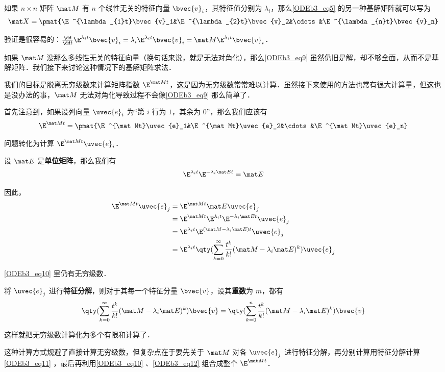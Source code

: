 如果 $n\times n$ 矩阵 $\mat M$ 有 $n$ 个线性无关的特征向量 $\bvec{v}_i$，其特征值分别为 $\lambda_i$，那么\autoref{ODEb3_eq5} 的另一种基解矩阵就可以写为
\begin{equation}\label{ODEb3_eq9}
\mat X=\pmat{\E^{\lambda_{1}t}\bvec{v}_1&\E^{\lambda_{2}t}\bvec{v}_2&\cdots&\E^{\lambda_{n}t}\bvec{v}_n}
\end{equation}

验证是很容易的：$\frac{\dd}{\dd t}\E^{\lambda_{i}t}\bvec{v}_i=\lambda_i\E^{\lambda_{i}t}\bvec{v}_i=\mat M\E^{\lambda_{i}t}\bvec{v}_i$．

如果 $\mat M$ 没那么多线性无关的特征向量（换句话来说，就是无法对角化），那么\autoref{ODEb3_eq9} 虽然仍旧是解，却不够全面，从而不是基解矩阵．我们接下来讨论这种情况下的基解矩阵求法．

我们的目标是脱离无穷级数来计算矩阵指数 $\E^{\mat Mt}$，这是因为无穷级数常常难以计算．虽然接下来使用的方法也常有很大计算量，但这也是没办法的事，$\mat M$ 无法对角化导致过程不会像\autoref{ODEb3_eq9} 那么简单了．

首先注意到，如果设列向量 $\uvec{e}_i$ 为“第 $i$ 行为 $1$，其余为 $0$”，那么我们应该有
\begin{equation}\label{ODEb3_eq12}
\E^{\mat Mt}=\pmat{\E^{\mat Mt}\uvec{e}_1&\E^{\mat Mt}\uvec{e}_2&\cdots&\E^{\mat Mt}\uvec{e}_n}
\end{equation}

问题转化为计算 $\E^{\mat Mt}\uvec{e}_i$．

设 $\mat E$ 是\textbf{单位矩阵}，那么我们有
\begin{equation}
\E^{\lambda_it}\E^{-\lambda_i\mat Et}=\mat E
\end{equation}

因此，
\begin{equation}\label{ODEb3_eq10}
\begin{aligned}
\E^{\mat Mt}\uvec{e}_j&=\E^{\mat Mt}\mat E\uvec{e}_j\\
&=\E^{\mat Mt}\E^{\lambda_it}\E^{-\lambda_i\mat Et}\uvec{e}_j\\
&=\E^{\lambda_it}\E^{(\mat M-\lambda_i\mat E)t}\uvec{e}_j\\
&=\E^{\lambda_it}\qty(\sum_{k=0}^\infty \frac{t^k}{k!}(\mat M-\lambda_i\mat E)^k)\uvec{e}_j
\end{aligned}
\end{equation}

\autoref{ODEb3_eq10} 里仍有无穷级数．

将 $\uvec{e}_j$ 进行\textbf{特征分解}，则对于其每一个特征分量 $\bvec{v}$，设其\textbf{重数}为 $m$，都有
\begin{equation}\label{ODEb3_eq11}
\qty(\sum_{k=0}^\infty \frac{t^k}{k!}(\mat M-\lambda_i\mat E)^k)\bvec{v}=\qty(\sum_{k=0}^n \frac{t^k}{k!}(\mat M-\lambda_i\mat E)^k)\bvec{v}
\end{equation}

这样就把无穷级数计算化为多个有限和计算了．

这种计算方式规避了直接计算无穷级数，但复杂点在于要先关于 $\mat M$ 对各 $\uvec{e}_j$ 进行特征分解，再分别计算用特征分解计算\autoref{ODEb3_eq11} ，最后再利用\autoref{ODEb3_eq10} 、\autoref{ODEb3_eq12} 组合成整个 $\E^{\mat Mt}$．









